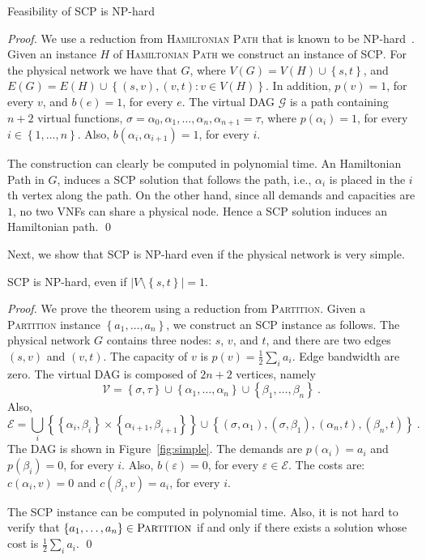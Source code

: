 \documentclass[runningheads]{llncs}
\newcommand{\set}[1]{\left\{ #1 \right\}}
\newcommand{\abs}[1]{\left| #1 \right|}
\newcommand{\half}{\frac{1}{2}}
\newcommand{\eps}{\varepsilon}
\newcommand{\scp}{\textsc{SCP}\xspace}
\newcommand{\calE}{\mathcal{E}}
\newcommand{\calG}{\mathcal{G}}
\newcommand{\calV}{\mathcal{V}}
\begin{document}
\begin{theorem}
Feasibility of \scp is NP-hard
\end{theorem}
\begin{proof}
We use a reduction from \textsc{Hamiltonian Path} that is known to be
NP-hard~\cite{GarJoh79}.
%
Given an instance $H$ of \textsc{Hamiltonian Path} we construct an
instance of \scp.  For the physical network we have that $G$, where
$V(G) = V(H) \cup \set{s,t}$, and $E(G) = E(H) \cup \set{(s,v),(v,t) :
  v \in V(H)}$.  In addition, $p(v) = 1$, for every $v$, and $b(e) =
1$, for every $e$.  The virtual DAG $\calG$ is a path containing $n+2$
virtual functions, $\sigma = \alpha_0, \alpha_1, \ldots, \alpha_n,
\alpha_{n+1} = \tau$, where $p(\alpha_i) = 1$, for every $i \in
\set{1,\ldots,n}$.  Also, $b(\alpha_i,\alpha_{i+1}) = 1$, for every
$i$.

The construction can clearly be computed in polynomial time.
%
An Hamiltonian Path in $G$, induces a \scp solution that follows the
path, i.e., $\alpha_i$ is placed in the $i$th vertex along the path.
%
On the other hand, since all demands and capacities are $1$, no two
VNFs can share a physical node.  Hence a \scp solution induces an
Hamiltonian path.
%
\qed
\end{proof}

Next, we show that \scp is NP-hard even if the physical network is
very simple. 

\begin{theorem}
\label{thm:simple}
\scp is NP-hard, even if $\abs{V \setminus \set{s,t}} = 1$.
\end{theorem}
\begin{proof}
We prove the theorem using a reduction from \textsc{Partition}.
Given a \textsc{Partition} instance $\set{a_1, \ldots, a_n}$, we
construct an \scp instance as follows.
%
The physical network $G$ contains three nodes: $s$, $v$, and $t$, and
there are two edges $(s,v)$ and $(v,t)$.  The capacity of $v$ is $p(v)
= \half \sum_i a_i$.  Edge bandwidth are zero.
%
The virtual DAG is composed of $2n+2$ vertices, namely
\[
\calV
= \set{\sigma,\tau}
  \cup \set{\alpha_1, \ldots, \alpha_n}
  \cup \set{\beta_1, \ldots, \beta_n}
~.
\]
Also,
\[
\calE
= \bigcup_i \set{ \set{\alpha_i,\beta_i} \times \set{\alpha_{i+1},\beta_{i+1}} } 
  \cup
  \set{ (\sigma,\alpha_1), (\sigma,\beta_1), (\alpha_n,t), (\beta_n,t) }
~.
\]
The DAG is shown in Figure~\ref{fig:simple}.
%
The demands are $p(\alpha_i) = a_i$ and $p(\beta_i) = 0$, for every
$i$.  Also, $b(\eps) = 0$, for every $\eps \in \calE$.  The costs are:
$c(\alpha_i,v) = 0$ and $c(\beta_i,v) = a_i$, for every $i$.

The \scp instance can be computed in polynomial time.
%
Also, it is not hard to verify that $\set{a_1, \ldots, a_n} \in
\textsc{Partition}$ if and only if there exists a solution whose cost
is $\half \sum_i a_i$.
%
\qed
\end{proof}
\end{document}
